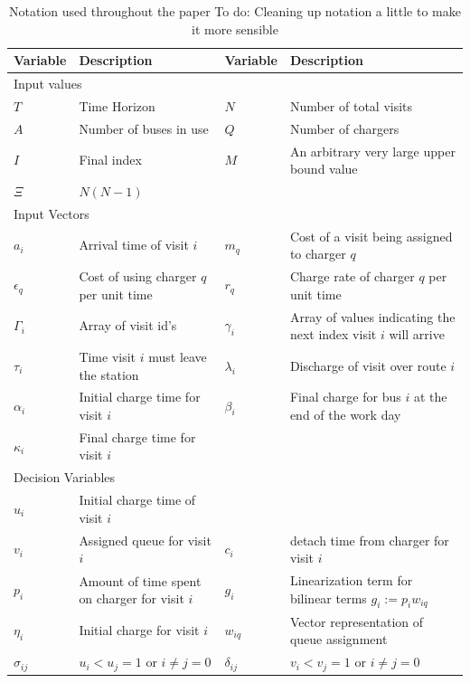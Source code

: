 \documentclass[letterpaper, 10pt, conference]{IEEEtran}
\newcommand{\TODO}[1]{{\color{green} To do: #1}} %
\begin{document}
\begin{table}[!t]
	\caption{Notation used throughout the paper \TODO{Cleaning up notation a little to make it more sensible}}
	\label{tab:variables}
	\centering
	\begin{tabular}{l l l l}
		\toprule
		\textbf{Variable} & \textbf{Description} & \textbf{Variable} & \textbf{Description} \\
		\toprule
		\multicolumn{4}{l}{Input values} \\
			$T$         & Time Horizon           &
			$N$         & Number of total visits                    \\
			$A$         & Number of buses in use &
			$Q$         & Number of chargers                        \\
			$I$         & Final index            &
			$M$         & An arbitrary very large upper bound value \\
			$\Xi$       & $N(N-1)$                                   \\
		\hline
		\multicolumn{4}{l}{Input Vectors} \\
			$a_i$        & Arrival time of visit  $i$              &
			$m_q$        & Cost of a visit being assigned to charger  $q$                  \\
			$\epsilon_q$ & Cost of using charger $q$ per unit time &
			$r_q$        & Charge rate of charger $q$ per unit time                        \\
			$\Gamma_i$   & Array of visit id's                     &
			$\gamma_i$   & Array of values indicating the next index visit $i$ will arrive \\
			$\tau_i$     & Time visit $i$ must leave the station   &
			$\lambda_i$  & Discharge of visit over route  $i$                              \\
			$\alpha_i$   & Initial charge time for visit  $i$      &
			$\beta_{i}$  & Final charge for bus $i$ at the end of the work day             \\
			$\kappa_i$   & Final charge time for visit $i$                                 \\
		\hline
		\multicolumn{4}{l}{Decision Variables} \\
			$u_i$         & Initial charge time of visit $i$                          \\
			$v_i$         & Assigned queue for visit $i$                  &
			$c_i$         & detach time from charger for visit $i$                    \\
			$p_i$         & Amount of time spent on charger for visit $i$ &
			$g_i$         & Linearization term for bilinear terms $g_i := p_i w_{iq}$ \\
			$\eta_i$      & Initial charge for visit $i$                  &
			$w_{iq}$      & Vector representation of queue assignment                 \\
			$\sigma_{ij}$ & $u_i < u_j = 1$ \textrm{ or } $i \neq j = 0$  &
			$\delta_{ij}$ & $v_i < v_j = 1$ \textrm{ or } $i \neq j = 0$              \\
			\bottomrule
	\end{tabular}
\end{table}
\end{document}
